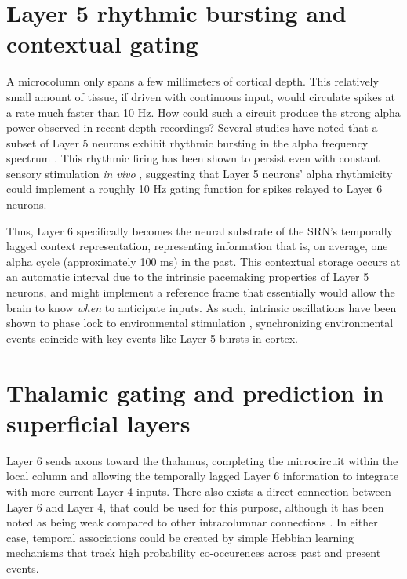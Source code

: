 \documentclass[defaultstyle,12pt]{thesis}
\begin{document}
{\section{Layer 5 rhythmic bursting and contextual gating}
A microcolumn only spans a few millimeters of cortical depth. This relatively small amount of tissue, if driven with continuous input, would circulate spikes at a rate much faster than 10 Hz. How could such a circuit produce the strong alpha power observed in recent depth recordings? Several studies have noted that a subset of Layer 5 neurons exhibit rhythmic bursting in the alpha frequency spectrum \cite{ConnorsGutnickPrince82,SilvaAmitaiConnors91,FlintConnors96,BollimuntaChenSchroederEtAl08}. This rhythmic firing has been shown to persist even with constant sensory stimulation \textit{in vivo} \cite{LuczakBarthoHarris13}, suggesting that Layer 5 neurons' alpha rhythmicity could implement a roughly 10 Hz gating function for spikes relayed to Layer 6 neurons. 

Thus, Layer 6 specifically becomes the neural substrate of the SRN's temporally lagged context representation, representing information that is, on average, one alpha cycle (approximately 100 ms) in the past. This contextual storage occurs at an automatic interval due to the intrinsic pacemaking properties of Layer 5 neurons, and might implement a reference frame that essentially would allow the brain to know \textit{when} to anticipate inputs. As such, intrinsic oscillations have been shown to phase lock to environmental stimulation \cite{LakatosKarmosMehtaEtAl08,SchroederLakatos09}, synchronizing environmental events coincide with key events like Layer 5 bursts in cortex. 

\section{Thalamic gating and prediction in superficial layers}
Layer 6 sends axons toward the thalamus, completing the microcircuit within the local column and allowing the temporally lagged Layer 6 information to integrate with more current Layer 4 inputs. There also exists a direct connection between Layer 6 and Layer 4, that could be used for this purpose, although it has been noted as being weak compared to other intracolumnar connections \cite{HirschMartinez06b}. In either case, temporal associations could be created by simple Hebbian learning mechanisms that track high probability co-occurences across past and present events.

}
\end{document}
